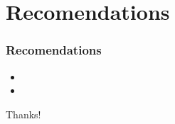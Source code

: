 \documentclass[10pt,a4paper]{beamer}
\begin{document}
\section{Recomendations}
\begin{frame}
\frametitle{Recomendations}
\begin{itemize}
\item
\item
\end{itemize}
\end{frame}
\large
\begin{frame}
\begin{center}
Thanks!
\end{center}
\end{frame}



\end{document}

